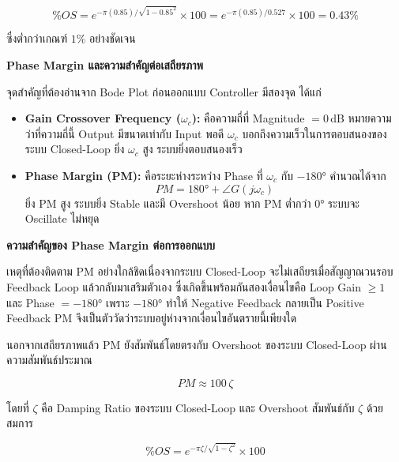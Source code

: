 \begin{equation}
  \%OS = e^{-\pi(0.85)/\sqrt{1-0.85^2}} \times 100 
       = e^{-\pi(0.85)/0.527} \times 100 
       = 0.43\%
  \label{eq:os_verify}
\end{equation}

ซึ่งต่ำกว่าเกณฑ์ $1\%$ อย่างชัดเจน

\textbf{Phase Margin และความสำคัญต่อเสถียรภาพ}

จุดสำคัญที่ต้องอ่านจาก Bode Plot ก่อนออกแบบ Controller มีสองจุด ได้แก่

\begin{itemize}
  \item \textbf{Gain Crossover Frequency ($\omega_c$):} คือความถี่ที่ 
        Magnitude $= 0$\,dB หมายความว่าที่ความถี่นี้ Output มีขนาดเท่ากับ 
        Input พอดี $\omega_c$ บอกถึงความเร็วในการตอบสนองของระบบ 
        Closed-Loop ยิ่ง $\omega_c$ สูง ระบบยิ่งตอบสนองเร็ว

  \item \textbf{Phase Margin (PM):} คือระยะห่างระหว่าง Phase ที่ $\omega_c$ 
        กับ $-180°$ คำนวณได้จาก
        \begin{equation}
          PM = 180° + \angle G(j\omega_c)
          \label{eq:phase_margin}
        \end{equation}
        ยิ่ง PM สูง ระบบยิ่ง Stable และมี Overshoot น้อย 
        หาก PM ต่ำกว่า $0°$ ระบบจะ Oscillate ไม่หยุด
\end{itemize}

\textbf{ความสำคัญของ Phase Margin ต่อการออกแบบ}

เหตุที่ต้องติดตาม PM อย่างใกล้ชิดเนื่องจากระบบ Closed-Loop
จะไม่เสถียรเมื่อสัญญาณวนรอบ Feedback Loop แล้วกลับมาเสริมตัวเอง
ซึ่งเกิดขึ้นพร้อมกันสองเงื่อนไขคือ Loop Gain $\geq 1$ และ Phase $= -180°$
เพราะ $-180°$ ทำให้ Negative Feedback กลายเป็น Positive Feedback
PM จึงเป็นตัววัดว่าระบบอยู่ห่างจากเงื่อนไขอันตรายนี้เพียงใด

นอกจากเสถียรภาพแล้ว PM ยังสัมพันธ์โดยตรงกับ Overshoot
ของระบบ Closed-Loop ผ่านความสัมพันธ์ประมาณ

\begin{equation}
  PM \approx 100\,\zeta
  \label{eq:pm_zeta}
\end{equation}

โดยที่ $\zeta$ คือ Damping Ratio ของระบบ Closed-Loop
และ Overshoot สัมพันธ์กับ $\zeta$ ด้วยสมการ

\begin{equation}
  \%OS = e^{-\pi\zeta/\sqrt{1-\zeta^2}} \times 100
  \label{eq:overshoot}
\end{equation}

